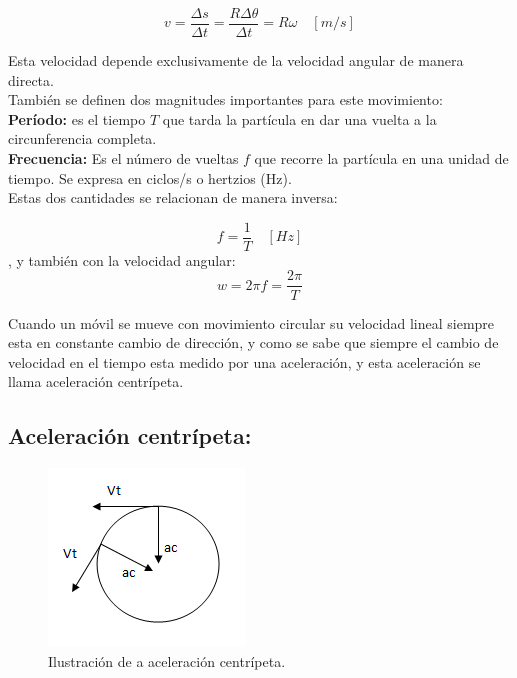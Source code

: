 \documentclass[a5paper,pagesize,10pt,bibtotoc,pointlessnumbers,
normalheadings,DIV=9,fleqn,x11names,table,twoside=false]{scrbook}
\begin{document}
\begin{equation}
v = \frac{\Delta s}{\Delta t} = \frac{R\Delta \theta}{\Delta t} = R\omega \quad [m/s]
\end{equation}

Esta velocidad depende exclusivamente de la velocidad angular de manera directa.\\

También se definen dos magnitudes importantes para este movimiento:\\

\textbf{Período:} es el tiempo $T$ que tarda la partícula en dar una vuelta a la circunferencia completa.\\

\textbf{Frecuencia:} Es el número de vueltas $f$ que recorre la partícula en una unidad de tiempo. Se expresa en ciclos/s o 
hertzios (Hz).\\

Estas dos cantidades se relacionan de manera inversa:

\begin{equation}
f = \frac{1}{T}\quad [Hz]
\end{equation}
, y también con la velocidad angular: 
\begin{equation}
w = 2\pi f = \frac{2\pi}{T}
\end{equation}

Cuando un móvil se mueve con movimiento circular su velocidad lineal siempre esta en constante cambio de dirección, y como se 
sabe que siempre el cambio de velocidad en el tiempo esta medido por una aceleración, y esta aceleración se llama aceleración 
centrípeta.

\subsection{Aceleración centrípeta:}

\begin{figure}[ht]
 \centering
 \includegraphics[scale=0.6]{images/aceleracion-centripeta.jpg}
 \caption{Ilustración de a aceleración centrípeta.}\label{ac}
\end{figure}
\end{document}
